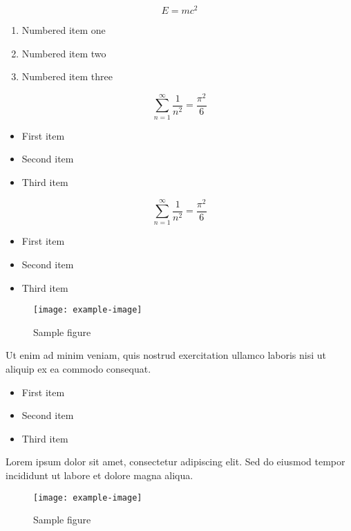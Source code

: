 \documentclass{article}
\begin{document}
\begin{equation}
    E = mc^2
\end{equation}


\begin{enumerate}
\item Numbered item one
\item Numbered item two
\item Numbered item three
\end{enumerate}

\begin{equation}
    \sum_{n=1}^{\infty} \frac{1}{n^2} = \frac{\pi^2}{6}
\end{equation}

\begin{itemize}
\item First item
\item Second item
\item Third item
\end{itemize}

\begin{equation}
    \sum_{n=1}^{\infty} \frac{1}{n^2} = \frac{\pi^2}{6}
\end{equation}

\begin{itemize}
\item First item
\item Second item
\item Third item
\end{itemize}

\begin{figure}[h]
    \centering
    \texttt{[image: example-image]}
    \caption{Sample figure}
    \label{fig:sample}
\end{figure}

Ut enim ad minim veniam, quis nostrud exercitation ullamco laboris nisi ut aliquip ex ea commodo consequat.

\begin{itemize}
\item First item
\item Second item
\item Third item
\end{itemize}

Lorem ipsum dolor sit amet, consectetur adipiscing elit. Sed do eiusmod tempor incididunt ut labore et dolore magna aliqua.

\begin{figure}[h]
    \centering
    \texttt{[image: example-image]}
    \caption{Sample figure}
    \label{fig:sample}
\end{figure}
\end{document}
